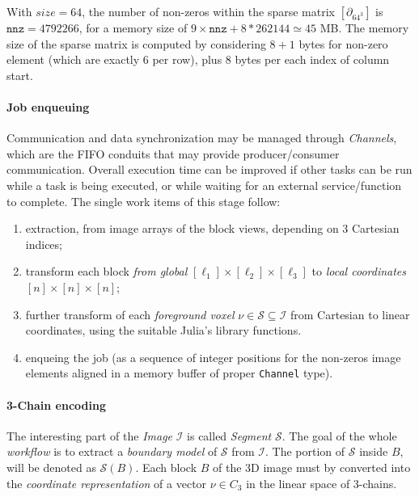 With $size=64$, the number of non-zeros within the sparse matrix $[\partial_{64^3}]$ is $\mathtt{nnz} = 4 792 266$, for a memory size of $9\times \mathtt{nnz}+8*262144 \simeq 45$ MB. The memory size of the sparse matrix is computed by considering $8+1$ bytes for non-zero element (which are exactly 6 per row), plus 8 bytes per each index of column start.  


\paragraph{Job enqueuing} Communication and data synchronization may be managed through \emph{Channels}, which are the FIFO conduits that may provide producer/consumer communication. Overall execution time can be improved if other tasks can be run while a task is being executed, or while waiting for an external service/function to complete. The single work items of this stage follow:
\begin{enumerate}

\item extraction, from image arrays of the block views, depending on 3 Cartesian indices;

\item transform  each block \emph{from global} $[\ell_1]\times[\ell_2]\times[\ell_3]$ to \emph{local coordinates} $[n]\times[n]\times[n]$;

\item further transform of each \emph{foreground voxel} $\nu\in\mathcal{S}\subseteq\mathcal{I}$ from Cartesian to linear coordinates, using the suitable Julia's library functions.

\item enqueing the job (as a sequence of integer positions for the non-zeros image elements aligned in a memory buffer of proper \texttt{Channel} type).
\end{enumerate}

\paragraph{3-Chain encoding} 
The interesting part of the \emph{Image} $\mathcal{I}$ is called \emph{Segment} $\mathcal{S}$. The goal of the whole \emph{workflow} is to extract a \emph{boundary model} of $\mathcal{S}$ from $\mathcal{I}$. The portion of $\mathcal{S}$ inside $B$, will be denoted as $\mathcal{S}(B)$.
Each block $B$ of the 3D image must by converted into the \emph{coordinate representation} of a vector $\nu\in C_3$ in the linear space  of 3-chains. 

